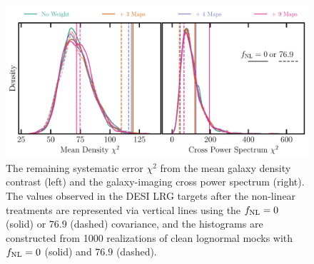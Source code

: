 
\begin{figure}
    \centering
    \includegraphics[width=\textwidth]{figures/chi2_tests.pdf}
    \caption{The remaining systematic error $\chi^{2}$ from the mean galaxy density contrast (left) and the galaxy-imaging cross power spectrum (right). The values observed in the DESI LRG targets after the non-linear treatments are represented via vertical lines using the $f_{\rm NL}=0$ (solid) or $76.9$ (dashed) covariance, and the histograms are constructed from 1000 realizations of clean lognormal mocks with $f_{\rm NL}=0$ (solid) and $76.9$ (dashed).}\label{fig:chi2test}
\end{figure}

